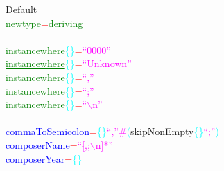 {\rm{}Default}\\\textcolor{green}{\underline{newtype}}\hsspace \hsspace \hsspace \textcolor{red}{=}\hsspace \hsspace \hsspace {\rm{}()}\hsspace \textcolor{green}{\underline{deriving}}\\\\\textcolor{green}{\underline{instance}}\hsspace \hsspace \hsspace \hsspace \hsspace \hsspace \textcolor{green}{\underline{where}}\hsspace \hsspace \hsspace \hsspace \hsspace \hsspace \textcolor{cyan}{\{}\textcolor{cyan}{\}}\hsspace \textcolor{red}{=}\hsspace \textcolor{magenta}{``0000''}\\\textcolor{green}{\underline{instance}}\hsspace \hsspace \hsspace \textcolor{green}{\underline{where}}\hsspace \hsspace \hsspace \textcolor{cyan}{\{}\textcolor{cyan}{\}}\hsspace \textcolor{red}{=}\hsspace \textcolor{magenta}{``Unknown''}\\\textcolor{green}{\underline{instance}}\hsspace \hsspace \hsspace \hsspace \hsspace \textcolor{green}{\underline{where}}\hsspace \hsspace \hsspace \hsspace \hsspace \textcolor{cyan}{\{}\textcolor{cyan}{\}}\hsspace \textcolor{red}{=}\hsspace \textcolor{magenta}{``,''}\\\textcolor{green}{\underline{instance}}\hsspace \textcolor{green}{\underline{where}}\hsspace \textcolor{cyan}{\{}\textcolor{cyan}{\}}\hsspace \textcolor{red}{=}\hsspace \textcolor{magenta}{``;''}\\\textcolor{green}{\underline{instance}}\hsspace \hsspace \hsspace \textcolor{green}{\underline{where}}\hsspace \hsspace \hsspace \textcolor{cyan}{\{}\textcolor{cyan}{\}}\hsspace \textcolor{red}{=}\hsspace \textcolor{magenta}{``$\backslash$n''}\\\\\textcolor{blue}{commaToSemicolon}\hsspace \textcolor{red}{=}\hsspace \textcolor{cyan}{\{}\textcolor{cyan}{\}}\hsspace \textcolor{magenta}{``,''}\hsspace \textcolor{magenta}{\#}\hsspace \textcolor{cyan}{(}{\rm{}skipNonEmpty}\hsspace \textcolor{cyan}{\{}\textcolor{cyan}{\}}\hsspace \textcolor{magenta}{``;''}\textcolor{cyan}{)}\\\textcolor{blue}{composerName}\hsspace \hsspace \hsspace \hsspace \hsspace \textcolor{red}{=}\hsspace \textcolor{magenta}{``[\ensuremath{\hat{ }},;$\backslash$n]*''}\\\textcolor{blue}{composerYear}\hsspace \hsspace \hsspace \hsspace \hsspace \textcolor{red}{=}\hsspace \textcolor{cyan}{\{}\textcolor{cyan}{\}}\hsspace 
